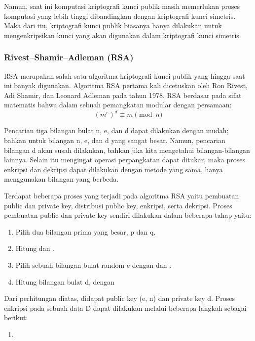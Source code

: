     Namun, saat ini komputasi kriptografi kunci publik masih memerlukan proses komputasi yang lebih tinggi dibandingkan dengan kriptografi kunci simetris. Maka dari itu, kriptografi kunci publik biasanya hanya dilakukan untuk mengenkripsikan kunci yang akan digunakan dalam kriptografi kunci simetris.

    \subsubsection{Rivest–Shamir–Adleman (RSA)}

    RSA merupakan salah satu algoritma kriptografi kunci publik yang hingga saat ini banyak digunakan. Algoritma RSA pertama kali dicetuskan oleh Ron Rivest, Adi Shamir, dan Leonard Adleman pada tahun 1978. RSA berdasar pada sifat matematis bahwa dalam sebuah pemangkatan modular dengan persamaan:
    \begin{equation}
      (m^e)^d  \equiv  m \pmod{n}
    \end{equation}

    Pencarian tiga bilangan bulat n, e, dan d dapat dilakukan dengan mudah; bahkan untuk bilangan n, e, dan d yang sangat besar. Namun, pencarian bilangan d akan susah dilakukan, bahkan jika kita mengetahui bilangan-bilangan lainnya. Selain itu mengingat operasi perpangkatan dapat ditukar, maka proses enkripsi dan dekripsi dapat dilakukan dengan metode yang sama, hanya menggunakan bilangan yang berbeda.

    Terdapat beberapa proses yang terjadi pada algoritma RSA yaitu pembuatan public dan private key, distribusi public key, enkripsi, serta dekripsi. Proses pembuatan public dan private key sendiri dilakukan dalam beberapa tahap yaitu:

    \begin{enumerate}
      \item Pilih dua bilangan prima yang besar, p dan q.
      \item Hitung dan .
      \item Pilih sebuah bilangan bulat random e dengan  dan .
      \item Hitung bilangan bulat d, dengan
    \end{enumerate}

    Dari perhitungan diatas, didapat public key (e, n) dan private key d.
    Proses enkripsi pada sebuah data D dapat dilakukan melalui beberapa langkah sebagai berikut:
    \begin{enumerate}
      \item
    \end{enumerate}

